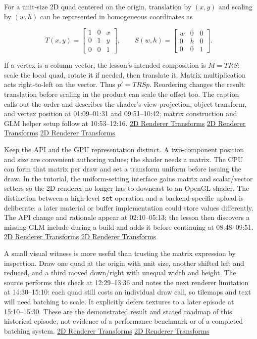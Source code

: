 For a unit-size 2D quad centered on the origin, translation by \((x,y)\) and scaling by \((w,h)\) can be represented in homogeneous coordinates as

\[
T(x,y)=\begin{bmatrix}1&0&x\\0&1&y\\0&0&1\end{bmatrix},\qquad
S(w,h)=\begin{bmatrix}w&0&0\\0&h&0\\0&0&1\end{bmatrix}.
\]

If a vertex is a column vector, the lesson's intended composition is \(M=TRS\): scale the local quad, rotate it if needed, then translate it. Matrix multiplication acts right-to-left on the vector. Thus \(p'=TRSp\). Reordering changes the result: translation before scaling in the product can scale the offset too. The caption calls out the order and describes the shader's view-projection, object transform, and vertex position at 01:09--01:31 and 09:51--10:42; matrix construction and GLM helper setup follow at 10:53--12:16. \href{https://www.youtube.com/watch?v=-Qt12lcAF0Y&t=69s}{2D Renderer Transforms} \href{https://www.youtube.com/watch?v=-Qt12lcAF0Y&t=591s}{2D Renderer Transforms} \href{https://www.youtube.com/watch?v=-Qt12lcAF0Y&t=653s}{2D Renderer Transforms}

Keep the API and the GPU representation distinct. A two-component position and size are convenient authoring values; the shader needs a matrix. The CPU can form that matrix per draw and set a transform uniform before issuing the draw. In the tutorial, the uniform-setting interface gains matrix and scalar/vector setters so the 2D renderer no longer has to downcast to an OpenGL shader. The distinction between a high-level \texttt{set} operation and a backend-specific upload is deliberate: a later material or buffer implementation could store values differently. The API change and rationale appear at 02:10--05:13; the lesson then discovers a missing GLM include during a build and adds it before continuing at 08:48--09:51. \href{https://www.youtube.com/watch?v=-Qt12lcAF0Y&t=130s}{2D Renderer Transforms} \href{https://www.youtube.com/watch?v=-Qt12lcAF0Y&t=528s}{2D Renderer Transforms}

A small visual witness is more useful than trusting the matrix expression by inspection. Draw one quad at the origin with unit size, another shifted left and reduced, and a third moved down/right with unequal width and height. The source performs this check at 12:29--13:36 and notes the next renderer limitation at 14:30--15:10: each quad still costs an individual draw call, so tilemaps and text will need batching to scale. It explicitly defers textures to a later episode at 15:10--15:30. These are the demonstrated result and stated roadmap of this historical episode, not evidence of a performance benchmark or of a completed batching system. \href{https://www.youtube.com/watch?v=-Qt12lcAF0Y&t=749s}{2D Renderer Transforms} \href{https://www.youtube.com/watch?v=-Qt12lcAF0Y&t=870s}{2D Renderer Transforms}

